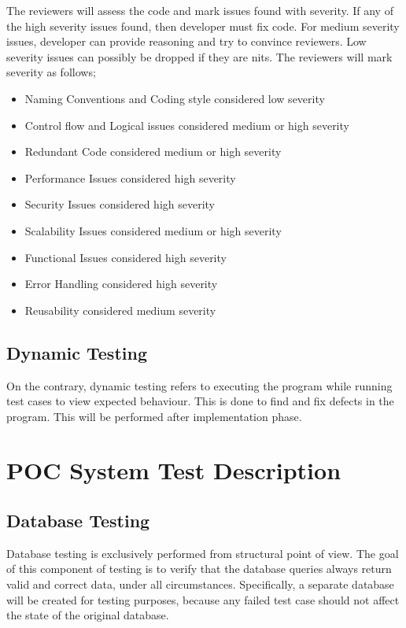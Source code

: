 \documentclass[12pt]{article}
\begin{document}
The reviewers will assess the code and mark issues found with severity. If any of the high severity issues found, then developer must fix code. For medium severity issues, developer can provide reasoning and try to convince reviewers. Low severity issues can possibly be dropped if they are nits. The reviewers will mark severity as follows;
\begin{itemize}
\item Naming Conventions and Coding style considered low severity
\item Control flow and Logical issues considered medium or high severity
\item Redundant Code considered medium or high severity
\item Performance Issues considered high severity
\item Security Issues considered high severity
\item Scalability Issues considered medium or high severity
\item Functional Issues considered high severity
\item Error Handling considered high severity
\item Reusability considered medium severity
\end{itemize}

\subsection{Dynamic Testing}
On the contrary, dynamic testing refers to executing the program while running test cases to view expected behaviour. This is done to find and fix defects in the program. This will be performed after implementation phase. 

%
%

\section{POC System Test Description}

\subsection{Database Testing}
Database testing is exclusively performed from structural point of view. The goal of this component of testing is to verify that the database queries always return valid and correct data, under all circumstances. Specifically, a separate database will be created for testing purposes, because any failed test case should not affect the state of the original database. 
\end{document}
